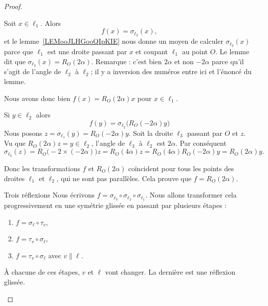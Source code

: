\begin{proof}
\begin{subproof}
            Soit \( x\in \ell_1\). Alors
            \begin{equation}
                f(x)=\sigma_{\ell_2}(x),
            \end{equation}
            et le lemme~\ref{LEMooJLHGooQIpKIE} nous donne un moyen de calculer \( \sigma_{\ell_2}(x)\) parce que \( \ell_1\) est une droite passant par \( x\) et coupant \( \ell_1\) au point \( O\). Le lemme dit que \( \sigma_{\ell_2}(x)=R_O(2\alpha)\). Remarque : c'est bien \( 2\alpha\) et non \( -2\alpha\) parce qu'il s'agit de l'angle de \( \ell_2\) à \( \ell_2\); il y a inversion des numéros entre ici et l'énoncé du lemme.

            Nous avons donc bien \( f(x)=R_O(2\alpha)x\) pour \( x\in \ell_1\).

            Si \( y\in\ell_2\) alors
            \begin{equation}
                f(y)=\sigma_{\ell_2}\big( R_O(-2\alpha)y \big)
            \end{equation}
            Nous posons \( z=\sigma_{\ell_1}(y)=R_O(-2\alpha)y\). Soit la droite \( \ell_3\) passant par \( O\) et \( z\). Vu que \( R_O(2\alpha)z=y\in \ell_2\), l'angle de \( \ell_3\) à \( \ell_2\) est \( 2\alpha\). Par conséquent
            \begin{equation}
                \sigma_{\ell_2}(z)=R_O\big( -2\times (-2\alpha) \big)z=R_O(4\alpha)z=R_O(4\alpha)R_O(-2\alpha)y=R_O(2\alpha)y.
            \end{equation}

            Donc les transformations \( f\) et \( R_O(2\alpha)\) coïncident pour tous les points des droites \( \ell_1\) et \( \ell_2\), qui ne sont pas parallèles. Cela prouve que \( f=R_{O}(2\alpha)\).

        \item[Trois réflexions]
            Nous écrivons \( f=\sigma_{\ell_3}\circ\sigma_{\ell_2}\circ\sigma_{\ell_1}\). Nous allons transformer cela progressivement en une symétrie glissée en passant par plusieurs étapes :
            \begin{enumerate}
                \item       \label{ITEMooHVYCooPhFMiv}
                    \( f=\sigma_{\ell}\circ\tau_v\),
                \item       \label{ITEMooUKGLooFlCcjt}
                    \( f=\tau_v\circ\sigma_{\ell}\),
                \item       \label{ITEMooWUCWooZSjofe}
                    \( f=\tau_v\circ\sigma_{\ell} \) avec \( v\parallel\ell\).
            \end{enumerate}
            À chacune de ces étapes, \( v\) et \( \ell\) vont changer. La dernière est une réflexion glissée.


\end{subproof}
\end{proof}
